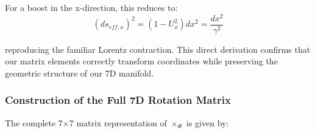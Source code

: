 \documentclass{article}
\begin{document}
For a boost in the x-direction, this reduces to:
\begin{equation}
(ds_{eff,x})^2 = (1 - U_x^2) dx^2 = \frac{dx^2}{\gamma^2}
\end{equation}

reproducing the familiar Lorentz contraction. This direct derivation confirms that our matrix elements correctly transform coordinates while preserving the geometric structure of our 7D manifold.

\subsubsection{Construction of the Full 7D Rotation Matrix}

The complete 7×7 matrix representation of $\times_\Phi$ is given by:

\begingroup
{}
\end{document}
